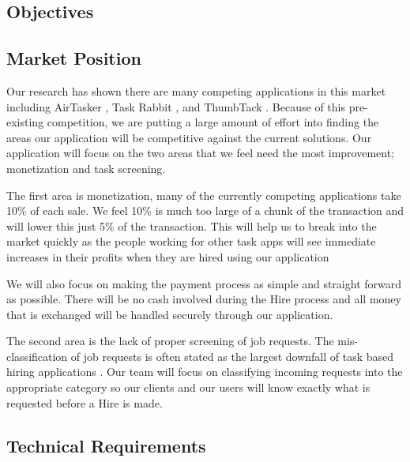 \documentclass[11pt]{article}
\begin{document}
\subsection{Objectives}


\subsection{Market Position}

Our research has shown there are many competing applications in this market including AirTasker \cite{AirTasker}, Task Rabbit \cite{TaskRabbit}, and ThumbTack \cite{ThumbTack}. 
Because of this pre-existing competition, we are putting a large amount of effort into finding the areas our application will be competitive against the current solutions. 
Our application will focus on the two areas that we feel need the most improvement; monetization and task screening.

The first area is monetization, many of the currently competing applications take 10\% of each sale. 
We feel 10\% is much too large of a chunk of the transaction and will lower this just 5\% of the transaction. 
This will help us to break into the market quickly as the people working for other task apps will see immediate increases in their profits when they are hired using our application

We will also focus on making the payment process as simple and straight forward as possible. 
There will be no cash involved during the Hire process and all money that is exchanged will be handled securely through our application.

The second area is the lack of proper screening of job requests. 
The mis-classification of job requests is often stated as the largest downfall of task based hiring applications \cite{ThumbTack_sucks}. 
Our team will focus on classifying incoming requests into the appropriate category so our clients and our users will know exactly what is requested before a Hire is made.

\subsection{Technical Requirements}


%
\end{document}
